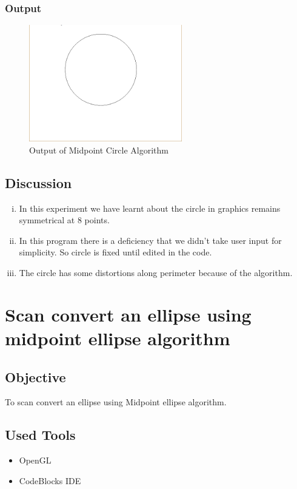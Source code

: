 \documentclass[11pt]{report}
\begin{document}
\subsection{Output}
\begin{figure}[!htb]
	\centering
	\includegraphics[height=2.0in]{midpoint_circle_out}
	\caption{Output of Midpoint Circle Algorithm}
\end{figure}

\section{Discussion}
\begin{enumerate}[(i)]
	\item In this experiment we have learnt about the circle in graphics remains symmetrical at 8 points.
	\item In this program there is a deficiency that we didn't take user input for simplicity. So circle is fixed until edited in the code.
	\item The circle has some  distortions along perimeter because of the algorithm.
\end{enumerate}

\chapter{Scan convert an ellipse using midpoint ellipse algorithm}
\section{Objective}
To scan convert an ellipse using Midpoint ellipse algorithm.
\section{Used Tools}
\begin{itemize}
	\item OpenGL
	\item CodeBlocks IDE
\end{itemize}
\end{document}
